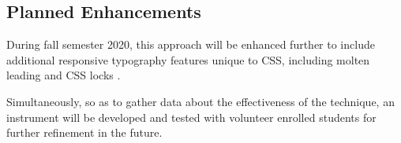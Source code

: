 \documentclass[sigplan,screen]{acmart}
\begin{document}
\subsection{Planned Enhancements}

During fall semester 2020, this approach will be enhanced further to include additional responsive typography features unique to CSS, including molten leading and CSS locks \cite{tb:ml,tb:cl}.

Simultaneously, so as to gather data about the effectiveness of the technique, an instrument will be developed and tested with volunteer enrolled students for further refinement in the future.



\end{document}
